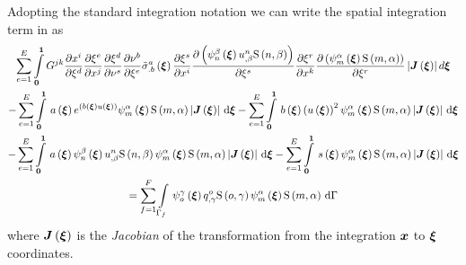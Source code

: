 Adopting the standard integration notation we can write the spatial
integration term in  as
\begin{multline}
  \dsum_{e=1}^{E}\dintl{\vectr{0}}{\vectr{1}}G^{jk}\delby{x^{i}}{\xi^{d}}
  \delby{\xi^{e}}{x^{j}}\delby{\xi^{d}}{\nu^{s}}
  \delby{\nu^{b}}{\xi^{e}}\fnof{{\tilde{\sigma}}^{a}_{.b}}{\vectr{\xi}}\delby{\xi^{s}}{x^{i}}
  \delby{\pbrac{\gbfn{n}{\beta}{\vectr{\xi}}\nodedof{u}{n}{\beta}\gsf{n}{\beta}}}{\xi^{s}}
  \delby{\xi^{r}}{x^{k}}\delby{\pbrac{\gbfn{m}{\alpha}{\vectr{\xi}}\gsf{m}{\alpha}}}{\xi^{r}}
  \abs{\fnof{\matr{J}}{\vectr{\xi}}}d\vectr{\xi} \\
  -\dsum_{e=1}^{E}\gint{\vectr{0}}{\vectr{1}}{\fnof{a}{\vectr{\xi}}e^{\pbrac{\fnof{b}{\vectr{\xi}}\fnof{u}{\vectr{\xi}}}}
    \gbfn{m}{\alpha}{\vectr{\xi}}\gsf{m}{\alpha}\abs{\fnof{\matr{J}}{\vectr{\xi}}}}{\vectr{\xi}}
  -\dsum_{e=1}^{E}\gint{\vectr{0}}{\vectr{1}}{\fnof{b}{\vectr{\xi}}\pbrac{\fnof{u}{\vectr{\xi}}}^{2}
    \gbfn{m}{\alpha}{\vectr{\xi}}\gsf{m}{\alpha}\abs{\fnof{\matr{J}}{\vectr{\xi}}}}{\vectr{\xi}} \\
  -\dsum_{e=1}^{E}\gint{\vectr{0}}{\vectr{1}}{\fnof{a}{\vectr{\xi}}\gbfn{n}{\beta}{\vectr{\xi}}\nodedof{u}{n}{\beta}\gsf{n}{\beta}
    \gbfn{m}{\alpha}{\vectr{\xi}}\gsf{m}{\alpha}\abs{\fnof{\matr{J}}{\vectr{\xi}}}}{\vectr{\xi}}  
  -\dsum_{e=1}^{E}\gint{\vectr{0}}{\vectr{1}}{\fnof{s}{\vectr{\xi}}\gbfn{m}{\alpha}{\vectr{\xi}}
    \gsf{m}{\alpha}\abs{\fnof{\matr{J}}{\vectr{\xi}}}}{\vectr{\xi}} \\
  =\dsum_{f=1}^{F}\gint{\Gamma_{f}}{}{\gbfn{o}{\gamma}{\vectr{\xi}}\nodedof{q}{o}{\gamma}
    \gsf{o}{\gamma}\gbfn{m}{\alpha}{\vectr{\xi}}\gsf{m}{\alpha}}{\Gamma}\end{multline}
where $\fnof{\matr{J}}{\vectr{\xi}}$ is the \emph{Jacobian} of the
transformation from the integration $ \boldsymbol{x} $ to $ \boldsymbol{\xi} $ coordinates.

